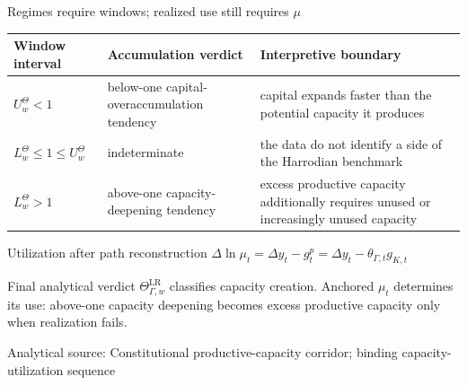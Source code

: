 \documentclass[10pt,aspectratio=169]{beamer}
\newcommand{\LR}{\mathrm{LR}}
\newcommand{\sourcefooter}[1]{%
  \par\vfill{\tiny\color{gray!70}Analytical source: #1}\vspace{-0.35em}}
\begin{document}
\begin{frame}{Regimes require windows; realized use still requires $\mu$}
  \scriptsize
  \renewcommand{\arraystretch}{1.12}
  \begin{tabular}{@{}L{0.25\textwidth}L{0.28\textwidth}L{0.39\textwidth}@{}}
    \toprule
    \textbf{Window interval} & \textbf{Accumulation verdict} & \textbf{Interpretive boundary} \\
    \midrule
    $U_w^{\Theta}<1$ & below-one capital-overaccumulation tendency & capital expands faster than the potential capacity it produces \\
    $L_w^{\Theta}\leq1\leq U_w^{\Theta}$ & indeterminate & the data do not identify a side of the Harrodian benchmark \\
    $L_w^{\Theta}>1$ & above-one capacity-deepening tendency & excess productive capacity additionally requires unused or increasingly unused capacity \\
    \bottomrule
  \end{tabular}

  \vspace{0.25em}
  \begin{block}{Utilization after path reconstruction}
    \centering
    \large
    $\displaystyle
    \Delta\ln\mu_t
    =\Delta y_t-g_t^p
    =\Delta y_t-\theta_{\Gamma,t}g_{K,t}$
  \end{block}
  \begin{alertblock}{Final analytical verdict}
    $\Theta_{\Gamma,w}^{\LR}$ classifies capacity creation. Anchored $\mu_t$ determines its use: above-one capacity deepening becomes excess productive capacity only when realization fails.
  \end{alertblock}
  \sourcefooter{Constitutional productive-capacity corridor; binding capacity-utilization sequence}
\end{frame}

\appendix
\end{document}
